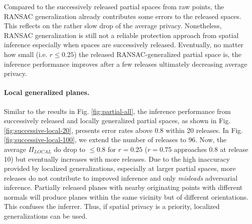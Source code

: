 Compared to the successively released partial spaces from raw points, the RANSAC generalization already contributes some errors to the released spaces. This reflects on the rather slow drop of the average privacy. Nonetheless, RANSAC generalization is still not a reliable protection approach from spatial inference especially when spaces are successively released. Eventually, no matter how small (i.e. $r \leq 0.25$) the released RANSAC-generalized partial space is, the inference performance improves after a few releases ultimately decreasing average privacy.

\paragraph{Local generalized planes.} Similar to the results in Fig. \ref{fig:partial-all}, the inference performance from successively released and locally generalized partial spaces, as shown in Fig. \ref{fig:successive-local-20}, presents error rates above 0.8 within 20 releases. In Fig. \ref{fig:successive-local-100}, we extend the number of releases to 96. Now, the average $\Pi_{LOCAL}$ do drop to $\leq 0.8$ for $r = 0.25$ ($r = 0.75$ approaches 0.8 at release 10) but eventually increases with more releases. Due to the high inaccuracy provided by localized generalizations, especially at larger partial spaces, more releases do not contribute to improved inference and only \textit{misleads} adversarial inference. Partially released planes with nearby originating points with different normals will produce planes within the same vicinity but of different orientations. This confuses the inferrer. Thus, if spatial privacy is a priority, localized generalizations can be used.

